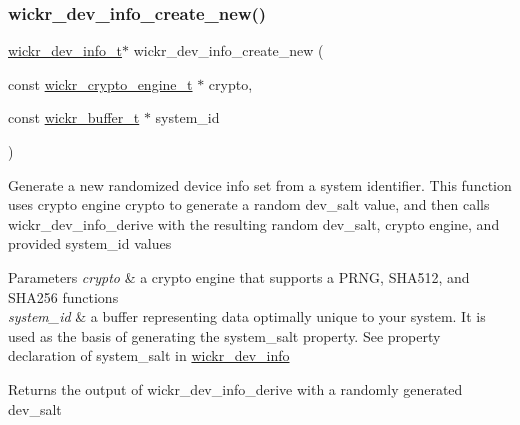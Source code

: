 \subsubsection{\texorpdfstring{wickr\+\_\+dev\+\_\+info\+\_\+create\+\_\+new()}{wickr\_dev\_info\_create\_new()}}
{\footnotesize\ttfamily \hyperlink{structwickr__dev__info}{wickr\+\_\+dev\+\_\+info\+\_\+t}$\ast$ wickr\+\_\+dev\+\_\+info\+\_\+create\+\_\+new (\begin{DoxyParamCaption}\item[{const \hyperlink{structwickr__crypto__engine}{wickr\+\_\+crypto\+\_\+engine\+\_\+t} $\ast$}]{crypto,  }\item[{const \hyperlink{structwickr__buffer}{wickr\+\_\+buffer\+\_\+t} $\ast$}]{system\+\_\+id }\end{DoxyParamCaption})}

Generate a new randomized device info set from a system identifier. This function uses crypto engine \textquotesingle{}crypto\textquotesingle{} to generate a random \textquotesingle{}dev\+\_\+salt\textquotesingle{} value, and then calls \textquotesingle{}wickr\+\_\+dev\+\_\+info\+\_\+derive\textquotesingle{} with the resulting random \textquotesingle{}dev\+\_\+salt\textquotesingle{}, crypto engine, and provided \textquotesingle{}system\+\_\+id\textquotesingle{} values


\begin{DoxyParams}{Parameters}
{\em crypto} & a crypto engine that supports a P\+R\+NG, S\+H\+A512, and S\+H\+A256 functions \\
\hline
{\em system\+\_\+id} & a buffer representing data optimally unique to your system. It is used as the basis of generating the \textquotesingle{}system\+\_\+salt\textquotesingle{} property. See property declaration of \textquotesingle{}system\+\_\+salt\textquotesingle{} in \textquotesingle{}\hyperlink{structwickr__dev__info}{wickr\+\_\+dev\+\_\+info}\textquotesingle{} \\
\hline
\end{DoxyParams}
\begin{DoxyReturn}{Returns}
the output of \textquotesingle{}wickr\+\_\+dev\+\_\+info\+\_\+derive\textquotesingle{} with a randomly generated \textquotesingle{}dev\+\_\+salt\textquotesingle{} 
\end{DoxyReturn}
\mbox{\label{group__wickr__dev__info_ga7f81b96fc222560762d608772b3f44bd}} 
